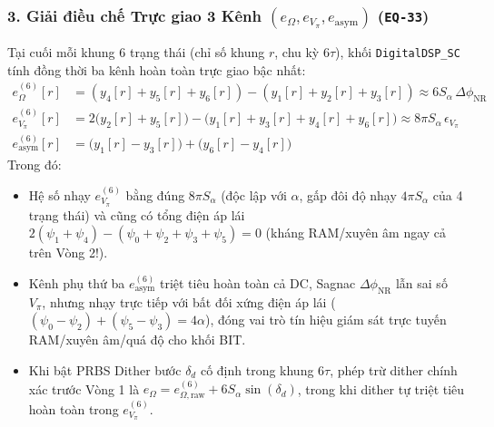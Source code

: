 \documentclass[11pt, a4paper]{article}
\begin{document}
\subsubsection*{3. Giải điều chế Trực giao 3 Kênh $(e_\Omega, e_{V_\pi}, e_{\text{asym}})$ (\texttt{EQ-33})}
Tại cuối mỗi khung 6 trạng thái (chỉ số khung $r$, chu kỳ $6\tau$), khối \texttt{DigitalDSP\_SC} tính đồng thời ba kênh hoàn toàn trực giao bậc nhất:
\begin{align}
e_\Omega^{(6)}[r] &= (y_4[r] + y_5[r] + y_6[r]) - (y_1[r] + y_2[r] + y_3[r]) \approx 6 S_\alpha\,\Delta\phi_{\text{NR}} \\
e_{V_\pi}^{(6)}[r] &= 2\bigl(y_2[r] + y_5[r]\bigr) - \bigl(y_1[r] + y_3[r] + y_4[r] + y_6[r]\bigr) \approx 8\pi S_\alpha\,\epsilon_{V_\pi} \\
e_{\text{asym}}^{(6)}[r] &= \bigl(y_1[r] - y_3[r]\bigr) + \bigl(y_6[r] - y_4[r]\bigr)
\end{align}
Trong đó:
\begin{itemize}
    \item Hệ số nhạy $e_{V_\pi}^{(6)}$ bằng đúng $8\pi S_\alpha$ (độc lập với $\alpha$, gấp đôi độ nhạy $4\pi S_\alpha$ của 4 trạng thái) và cũng có tổng điện áp lái $2(\psi_1+\psi_4) - (\psi_0+\psi_2+\psi_3+\psi_5) = 0$ (kháng RAM/xuyên âm ngay cả trên Vòng 2!).
    \item Kênh phụ thứ ba $e_{\text{asym}}^{(6)}$ triệt tiêu hoàn toàn cả DC, Sagnac $\Delta\phi_{\text{NR}}$ lẫn sai số $V_\pi$, nhưng nhạy trực tiếp với bất đối xứng điện áp lái ($(\psi_0-\psi_2)+(\psi_5-\psi_3) = 4\alpha$), đóng vai trò tín hiệu giám sát trực tuyến RAM/xuyên âm/quá độ cho khối BIT.
    \item Khi bật PRBS Dither bước $\delta_d$ cố định trong khung $6\tau$, phép trừ dither chính xác trước Vòng 1 là $e_\Omega = e_{\Omega,\text{raw}}^{(6)} + 6 S_\alpha \sin(\delta_d)$, trong khi dither tự triệt tiêu hoàn toàn trong $e_{V_\pi}^{(6)}$.
\end{itemize}
\end{document}
